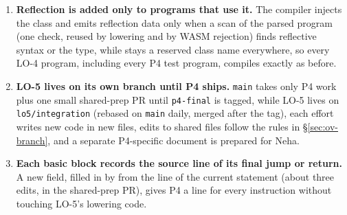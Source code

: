 \documentclass[10pt]{article}
\newcommand{\code}[1]{\texttt{\small #1}}
\newcommand{\decitem}[1]{\needspace{6\baselineskip}\setcounter{enumi}{\numexpr#1-1\relax}\item}
\begin{document}
\begin{tcolorbox}[colback=black!3,colframe=black!35,boxrule=0.5pt,arc=1pt,left=5pt,right=5pt,top=3pt,bottom=3pt,title={\textbf{Already decided (11/26)}},coltitle=black,colbacktitle=black!10,fonttitle=\normalsize]
\begin{enumerate}[label=\textbf{\arabic*.},ref=\arabic*,leftmargin=1.8em,itemsep=0.3em]
\decitem{1}\label{dec:gating}\textbf{Reflection is added only to programs that use it.} The compiler injects the  class and emits reflection data only when a scan of the parsed program (one  check, reused by lowering and by WASM rejection) finds reflective syntax or the  type, while  stays a reserved class name everywhere, so every LO-4 program, including every P4 test program, compiles exactly as before.
\decitem{2}\label{dec:landing}\textbf{LO-5 lives on its own branch until P4 ships.} \code{main} takes only P4 work plus one small shared-prep PR until \code{p4-final} is tagged, while LO-5 lives on \code{lo5/integration} (rebased on \code{main} daily, merged after the tag), each effort writes new code in new files, edits to shared files follow the rules in \S\ref{sec:ov-branch}, and a separate P4-specific document is prepared for Neha.
\decitem{4}\label{dec:termline}\textbf{Each basic block records the source line of its final jump or return.} A new  field, filled in by  from the line of the current statement (about three edits, in the shared-prep PR), gives P4 a line for every instruction without touching LO-5's lowering code.
\end{enumerate}
\end{tcolorbox}
\end{document}
